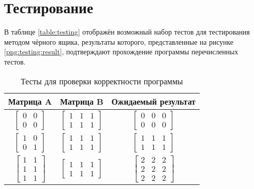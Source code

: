         
    \section{Тестирование}
        В таблице \ref{table:testing} отображён возможный набор тестов
        для тестирования методом чёрного ящика, результаты которого, 
        представленные на рисунке \ref{png:testing:result}, подтверждают
        прохождение программы перечисленных тестов.

        \begin{table}[]
            \caption{Тесты для проверки корректности программы}
            \centering
            \begin{tabular}{|c|c|c|}
                \hline
                Матрица A                                                & Матрица B                                              & Ожидаемый результат                                    \\ \hline
                $\begin{bmatrix} 0 & 0 \\ 0 & 0 \end{bmatrix}$           & $\begin{bmatrix} 1 & 1 & 1 \\ 1 & 1 & 1 \end{bmatrix}$ & $\begin{bmatrix} 0 & 0 & 0 \\ 0 & 0 & 0 \end{bmatrix}$ \\ \hline
                $\begin{bmatrix} 1 & 0 \\ 0 & 1 \end{bmatrix}$           & $\begin{bmatrix} 1 & 1 & 1 \\ 1 & 1 & 1 \end{bmatrix}$ & $\begin{bmatrix} 1 & 1 & 1 \\ 1 & 1 & 1 \end{bmatrix}$ \\ \hline
                $\begin{bmatrix} 1 & 1 \\ 1 & 1 \\ 1 & 1 \end{bmatrix}$  & $\begin{bmatrix} 1 & 1 & 1 \\ 1 & 1 & 1 \end{bmatrix}$ & $\begin{bmatrix} 2 & 2 & 2 \\ 2 & 2 & 2 \\ 2 & 2 & 2 \end{bmatrix}$ \\ \hline

\end{tabular}
\end{table}
